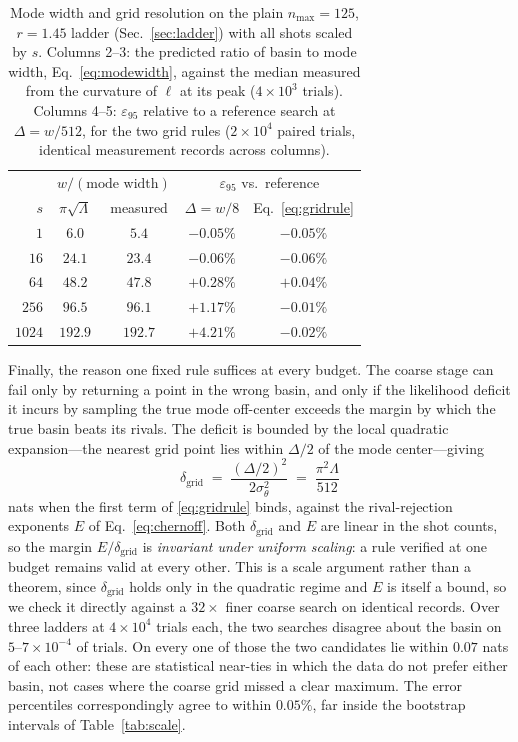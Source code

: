 \documentclass[%
 twocolumn,
 amsmath,amssymb,
prx,
longbibliography
]{revtex4-2}
\begin{document}
\begin{table}[t]
\caption{\label{tab:grid}Mode width and grid resolution on the plain $n_{\max}=125$, $r=1.45$ ladder (Sec.~\ref{sec:ladder}) with all shots scaled by $s$. Columns 2--3: the predicted ratio of basin to mode width, Eq.~\eqref{eq:modewidth}, against the median measured from the curvature of $\ell$ at its peak ($4\times10^3$ trials). Columns 4--5: $\varepsilon_{95}$ relative to a reference search at $\Delta = w/512$, for the two grid rules ($2\times 10^4$ paired trials, identical measurement records across columns).}
\begin{ruledtabular}
\begin{tabular}{rcccc}
 & \multicolumn{2}{c}{$w/(\text{mode width})$} & \multicolumn{2}{c}{$\varepsilon_{95}$ vs.\ reference} \\
$s$ & $\pi\sqrt\Lambda$ & measured & $\Delta = w/8$ & Eq.~\eqref{eq:gridrule} \\
\hline
$1$    & $6.0$   & $5.4$   & $-0.05\%$ & $-0.05\%$ \\
$16$   & $24.1$  & $23.4$  & $-0.06\%$ & $-0.06\%$ \\
$64$   & $48.2$  & $47.8$  & $+0.28\%$ & $+0.04\%$ \\
$256$  & $96.5$  & $96.1$  & $+1.17\%$ & $-0.01\%$ \\
$1024$ & $192.9$ & $192.7$ & $+4.21\%$ & $-0.02\%$ \\
\end{tabular}
\end{ruledtabular}
\end{table}

Finally, the reason one fixed rule suffices at every budget. The coarse stage can fail only by returning a point in the wrong basin, and only if the likelihood deficit it incurs by sampling the true mode off-center exceeds the margin by which the true basin beats its rivals. The deficit is bounded by the local quadratic expansion---the nearest grid point lies within $\Delta/2$ of the mode center---giving
\begin{equation}\label{eq:deficit}
    \delta_{\mathrm{grid}} \;=\; \frac{(\Delta/2)^2}{2\sigma_\theta^2} \;=\; \frac{\pi^2 \Lambda}{512}
\end{equation}
nats when the first term of \eqref{eq:gridrule} binds, against the rival-rejection exponents $E$ of Eq.~\eqref{eq:chernoff}. Both $\delta_{\mathrm{grid}}$ and $E$ are linear in the shot counts, so the margin $E/\delta_{\mathrm{grid}}$ is \emph{invariant under uniform scaling}: a rule verified at one budget remains valid at every other. This is a scale argument rather than a theorem, since $\delta_{\mathrm{grid}}$ holds only in the quadratic regime and $E$ is itself a bound, so we check it directly against a $32\times$ finer coarse search on identical records. Over three ladders at $4\times10^4$ trials each, the two searches disagree about the basin on $5$--$7 \times 10^{-4}$ of trials. On every one of those the two candidates lie within $0.07$ nats of each other: these are statistical near-ties in which the data do not prefer either basin, not cases where the coarse grid missed a clear maximum. The error percentiles correspondingly agree to within $0.05\%$, far inside the bootstrap intervals of Table~\ref{tab:scale}.
\end{document}
